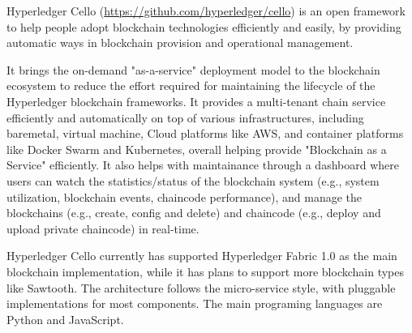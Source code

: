 Hyperledger Cello (\url{https://github.com/hyperledger/cello}) is an open framework to help people adopt blockchain technologies efficiently and easily, by providing automatic ways in blockchain provision and operational management. 

It brings the on-demand "as-a-service" deployment model to the blockchain ecosystem to reduce the effort required for maintaining the lifecycle of the Hyperledger blockchain frameworks. It provides a multi-tenant chain service efficiently and automatically on top of various infrastructures, including baremetal, virtual machine, Cloud platforms like AWS, and container platforms like Docker Swarm and Kubernetes, overall helping provide "Blockchain as a Service" efficiently. It also helps with maintainance through a dashboard where users can watch the statistics/status of the blockchain system (e.g., system utilization, blockchain events, chaincode performance), and manage the blockchains (e.g., create, config and delete) and chaincode (e.g., deploy and upload private chaincode) in real-time.

Hyperledger Cello currently has supported Hyperledger Fabric 1.0 as the main blockchain implementation, while it has plans to support more blockchain types like Sawtooth. The architecture follows the micro-service style, with pluggable implementations for most components. The main programing languages are Python and JavaScript.

